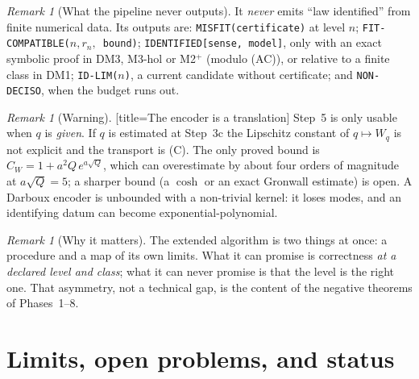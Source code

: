 \documentclass[11pt]{article}
\theoremstyle{plain}
\theoremstyle{definition}
\theoremstyle{remark}
\newtheorem{remark}[theorem]{Remark}
\newenvironment{caution}{\begin{remark}[Warning]}{\end{remark}}
\newenvironment{takeaway}{\begin{remark}[Why it matters]}{\end{remark}}
\newenvironment{aside}[1]{\begin{remark}[#1]}{\end{remark}}
\begin{document}
\begin{aside}{What the pipeline never outputs}
It \emph{never} emits ``law identified'' from finite numerical data. Its outputs are: \texttt{MISFIT(certificate)} at level $n$; \texttt{FIT-COMPATIBLE($n,r_n,$ bound)}; \texttt{IDENTIFIED[sense, model]}, only with an exact symbolic proof in DM3, M3-hol or M2$^+$ (modulo (AC)), or relative to a finite class in DM1; \texttt{ID-LIM($n$)}, a current candidate without certificate; and \texttt{NON-DECISO}, when the budget runs out.
\end{aside}

\begin{caution}[title=The encoder is a translation]
Step~5 is only usable when $q$ is \emph{given}. If $q$ is estimated at Step~3c the Lipschitz constant of $q\mapsto W_q$ is not explicit and the transport is (C). The only proved bound is $C_W=1+a^2Q\,e^{a\sqrt Q}$, which can overestimate by about four orders of magnitude at $a\sqrt Q=5$; a sharper bound (a $\cosh$ or an exact Gronwall estimate) is open. A Darboux encoder is unbounded with a non-trivial kernel: it loses modes, and an identifying datum can become exponential-polynomial.
\end{caution}

\begin{takeaway}
The extended algorithm is two things at once: a procedure and a map of its own limits. What it can promise is correctness \emph{at a declared level and class}; what it can never promise is that the level is the right one. That asymmetry, not a technical gap, is the content of the negative theorems of Phases~1--8.
\end{takeaway}



\section{Limits, open problems, and status}\label{sec:limits}
\end{document}
